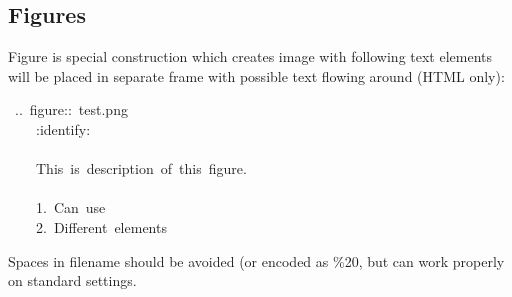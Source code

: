 \documentclass[12pt]{article}
\begin{document}
\subsection{Figures}

Figure is special construction which creates image with following text
elements will be placed in separate frame with possible text flowing around
(HTML only):

\begin{ttfamily}\begin{flushleft}
\mbox{~..~figure::~test.png}\\
\mbox{~~~~:identify:}\\
\mbox{}\\
\mbox{~~~~This~is~description~of~this~figure.}\\
\mbox{}\\
\mbox{~~~~1.~Can~use~}\\
\mbox{~~~~2.~Different~elements}\\
\end{flushleft}\end{ttfamily}

Spaces in filename should be avoided (or encoded as \%20, but can work properly
on standard settings.
\end{document}
